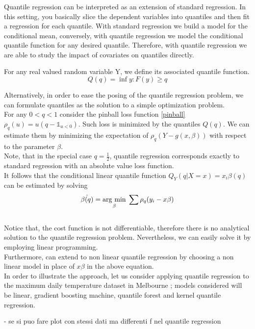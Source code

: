 Quantile regression can be interpreted as an extension of standard regression. In this setting, you basically slice the dependent variables into quantiles and then fit a regression for each quantile. With standard regression we build a model for the conditional mean, conversely, with quantile regression we model the conditional quantile function for any desired quantile. 
Therefore, with quantile regression we are able to study the impact of covariates on quantiles directly.
\begin{definition}
    For any real valued random variable Y, we define its associated quantile function.
    \begin{equation}
        Q(q)=\inf{y:F(y)\geq q}
    \end{equation}
\end{definition}
Alternatively, in order  to ease the posing of the quantile regression problem, we can formulate quantiles as the solution to a simple optimization problem.
\\
For any $0<q<1$ consider the pinball loss function \ref{pinball} $\rho_q(u)=u(q-\mathbb{1}_{u<0})$. 
Such loss is minimized by the quantiles $Q(q)$.
We can estimate them by minimizing the expectation of $\rho_q(Y-g(x,\beta))$ with respect to the parameter $\beta$.
\\
Note, that in the special case $q=\frac{1}{2}$,  quantile regression corresponds exactly to standard regression with an absolute value loss function.
\\
It follows that the conditional linear quantile function $Q_Y(q|X=x)=x_i\beta(q)$ can be estimated by solving
\begin{equation}\label{}
    \hat{\beta(q)}=\underset{\beta}{\operatorname{arg}\,\operatorname{min}}\;\sum \rho_q   (y_i-x \beta)
\end{equation}
\\
Notice that, the cost function is not differentiable, therefore there is no analytical solution to the quantile regression problem. Nevertheless, we can easily solve it by employing linear programming.
\\
Furthermore, can extend to non linear quantile regression by choosing a non linear model in place of $x\beta$ in the above equation.
\\
In order to illustrate the approach, let us consider applying quantile regression to the maximum daily temperature dataset in Melbourne \cite{hyndman1996estimating}; models considered will be linear, gradient boosting machine, quantile forest\cite{} and kernel quantile regression.

- se si puo fare plot con stessi dati ma differenti f nel quantile regression